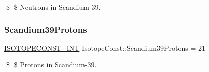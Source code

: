 \$ \$ Neutrons in Scandium-\/39. \mbox{\label{group___isotope_const-_scandium-_sc39_gadb48a2d14c26c7903f99f9d8c5263e45}} 
\subsubsection{\texorpdfstring{Scandium39\+Protons}{Scandium39Protons}}
{\footnotesize\ttfamily \mbox{\hyperlink{group___isotope_const-_macros_ga5f18360b3e99483a35c32d789e62621c}{I\+S\+O\+T\+O\+P\+E\+C\+O\+N\+S\+T\+\_\+\+I\+NT}} Isotope\+Const\+::\+Scandium39\+Protons = 21}

\$ \$ Protons in Scandium-\/39. 